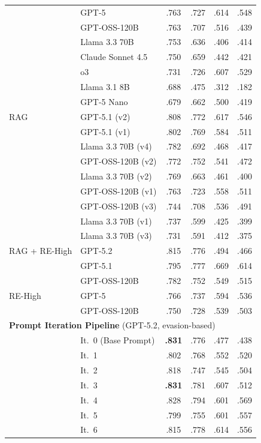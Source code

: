 \documentclass[11pt]{article}
\begin{document}
\begin{table}[p]
\begin{tabular*}{\textwidth}{@{\extracolsep{\fill}}llcccc@{}}
 & GPT-5 & .763 & .727 & .614 & .548 \\
 & GPT-OSS-120B & .763 & .707 & .516 & .439 \\
 & Llama 3.3 70B & .753 & .636 & .406 & .414 \\
 & Claude Sonnet 4.5 & .750 & .659 & .442 & .421 \\
 & o3 & .731 & .726 & .607 & .529 \\
 & Llama 3.1 8B & .688 & .475 & .312 & .182 \\
 & GPT-5 Nano & .679 & .662 & .500 & .419 \\
\addlinespace
RAG
 & GPT-5.1 (v2) & .808 & .772 & .617 & .546 \\
 & GPT-5.1 (v1) & .802 & .769 & .584 & .511 \\
 & Llama 3.3 70B (v4) & .782 & .692 & .468 & .417 \\
 & GPT-OSS-120B (v2) & .772 & .752 & .541 & .472 \\
 & Llama 3.3 70B (v2) & .769 & .663 & .461 & .400 \\
 & GPT-OSS-120B (v1) & .763 & .723 & .558 & .511 \\
 & GPT-OSS-120B (v3) & .744 & .708 & .536 & .491 \\
 & Llama 3.3 70B (v1) & .737 & .599 & .425 & .399 \\
 & Llama 3.3 70B (v3) & .731 & .591 & .412 & .375 \\
\addlinespace
RAG + RE-High & GPT-5.2 & .815 & .776 & .494 & .466 \\
 & GPT-5.1 & .795 & .777 & .669 & .614 \\
 & GPT-OSS-120B & .782 & .752 & .549 & .515 \\
\addlinespace
RE-High & GPT-5 & .766 & .737 & .594 & .536 \\
 & GPT-OSS-120B & .750 & .728 & .539 & .503 \\
\midrule
\multicolumn{6}{l}{\textbf{Prompt Iteration Pipeline} (GPT-5.2, evasion-based)} \\
\midrule
 & It.~0 (Base Prompt) & \textbf{.831} & .776 & .477 & .438 \\
 & It.~1 & .802 & .768 & .552 & .520 \\
 & It.~2 & .818 & .747 & .545 & .504 \\
 & It.~3 & \textbf{.831} & .781 & .607 & .512 \\
 & It.~4 & .828 & .794 & .601 & .569 \\
 & It.~5 & .799 & .755 & .601 & .557 \\
 & It.~6 & .815 & .778 & .614 & .556 \\

\end{tabular*}
\end{table}
\end{document}
